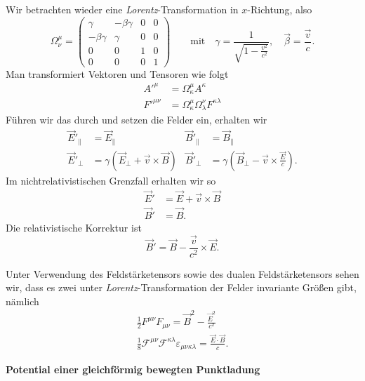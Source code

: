 Wir betrachten wieder eine \emph{Lorentz}-Transformation in $x$-Richtung, also
\begin{equation*}
\Omega_\nu^\mu = \begin{pmatrix}
\gamma &-\beta\gamma & 0 & 0 \\
-\beta\gamma & \gamma & 0 & 0 \\
0 & 0 & 1 & 0\\
0 & 0 & 0 & 1
\end{pmatrix}  \qquad \text{mit}\quad \gamma=\frac{1}{\sqrt{1-\frac{v^2}{c^2}}}, \quad \vec{\beta} = \frac{\vec{v}}{c}.
\end{equation*}
Man transformiert Vektoren und Tensoren wie folgt
\begin{align*}
A'^\mu &= \Omega_\kappa^\mu A^\kappa\\
F'^{\mu\nu} &= \Omega_\kappa^\mu\Omega_\lambda^\nu F^{\kappa\lambda}
\end{align*}
Führen wir das durch und setzen die Felder ein, erhalten wir
\begin{align*}
\vec{E}'_\parallel &= \vec{E}_\parallel & \vec{B}'_\parallel &=\vec{B}_\parallel\\
\vec{E}'_\perp &= \gamma\left(\vec{E}_\perp + \vec{v}\times\vec{B}\right)
& \vec{B}'_\perp &= \gamma\left(\vec{B}_\perp - \vec{v}\times\frac{\vec{E}}{c}\right).
\end{align*}
Im nichtrelativistischen Grenzfall erhalten wir so
\begin{align*}
\vec{E}' &= \vec{E} + \vec{v}\times\vec{B}\\
\vec{B}' &= \vec{B}.
\end{align*}
Die relativistische Korrektur ist
\begin{equation*}
\vec{B}' = \vec{B} - \frac{\vec{v}}{c^2}\times\vec{E}.
\end{equation*}

Unter Verwendung des Feldstärketensors sowie des dualen Feldstärketensors sehen wir, dass es zwei unter \emph{Lorentz}-Transformation der Felder invariante Größen gibt, nämlich
\begin{align*}
\frac{1}{2}F^{\mu\nu}F_{\mu\nu}= \vec{B}^2 -\frac{\vec{E}^2}{c^2} \\
\frac{1}{8}\mathcal{F}^{\mu\nu}\mathcal{F}^{\kappa\lambda}\varepsilon_{\mu\nu\kappa\lambda} = \frac{\vec{E}\cdot\vec{B}}{c}.
\end{align*}

\textbf{Potential einer gleichförmig bewegten Punktladung}\\

